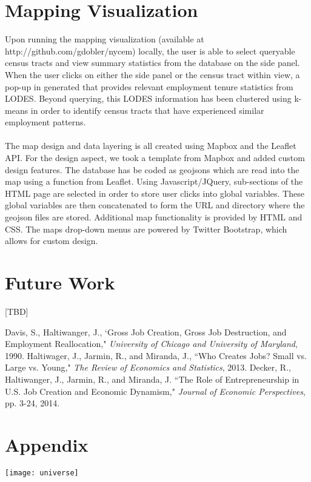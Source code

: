 \documentclass[article, 11pt]{article} %
\begin{document}
\section*{Mapping Visualization}

Upon running the mapping visualization (available at http://github.com/gdobler/nycem) locally, the user is able to select queryable census tracts and view summary statistics from the database on the side panel. When the user clicks on either the side panel or the census tract within view, a pop-up in generated that provides relevant employment tenure statistics from LODES. Beyond querying, this LODES information has been clustered using k-means in order to identify census tracts that have experienced similar employment patterns.
\\\\
The map design and data layering is all created using Mapbox and the Leaflet API. For the design aspect, we took a template from Mapbox and added custom design features. The database has be coded as geojsons which are read into the map using a function from Leaflet. Using Javascript/JQuery, sub-sections of the HTML page are selected in order to store user clicks into global variables. These global variables are then concatenated to form the URL and directory where the geojson files are stored. Additional map functionality is provided by HTML and CSS. The maps drop-down menus are powered by Twitter Bootstrap, which allows for custom design.


\section*{Future Work}

[TBD]



\begin{thebibliography}{100}
 Davis, S., Haltiwanger, J., `Gross Job Creation, Gross Job Destruction, and Employment Reallocation," \emph{University of Chicago and University of Maryland}, 1990.
 Haltiwager, J., Jarmin, R., and Miranda, J., ``Who Creates Jobs? Small vs. Large vs. Young," \emph{The Review of Economics and Statistics}, 2013.
 Decker, R., Haltiwanger, J., Jarmin, R., and Miranda, J. ``The Role of Entrepreneurship in U.S. Job Creation and Economic Dynamism," \emph{Journal of Economic Perspectives}, pp. 3-24, 2014.
\end{thebibliography}


\section*{Appendix}

\texttt{[image: universe]}

\end{document}
